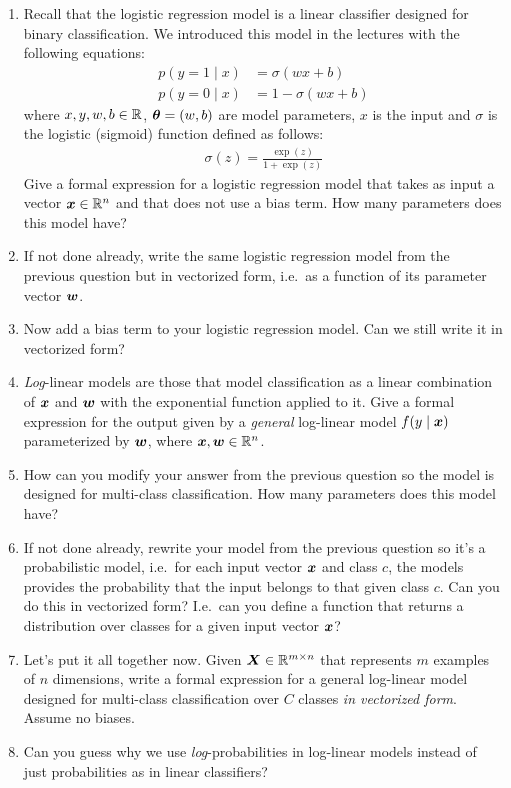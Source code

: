 \documentclass[11pt,a4paper]{article}
\begin{document}
\begin{enumerate}[label=(\alph*)]
    \item Recall that the logistic regression model is a linear classifier
          designed for binary classification. We introduced this model in the
          lectures with the following equations:
          \begin{align}
              p(y=1\mid x) & = \sigma(w x + b)     \\
              p(y=0\mid x) & = 1 - \sigma(w x + b)
          \end{align}
          where $x,y,w,b\in\mathbb{R}$, ${\boldsymbol{\theta}}=(w,b)$ are model parameters, $x$ is
          the input and $\sigma$ is the logistic (sigmoid) function defined
          as follows:
          \begin{align}\label{eq:sigmoid}
              \sigma(z) = \frac{\exp{(z)}}{1 + \exp{(z)}}
          \end{align}
          Give a formal expression for a logistic regression model that takes as
          input a vector ${\boldsymbol{x}}\in\mathbb{R}^n$ and that does not use a bias term.
          How many parameters does this model have?
    \item If not done already, write the same logistic regression model from the
          previous question but in vectorized form, i.e.\ as a function of its
          parameter vector ${\boldsymbol{w}}$.
    \item Now add a bias term to your logistic regression model. Can we still
          write it in vectorized form?
    \item \emph{Log}-linear models are those that model classification as a
          linear combination of ${\boldsymbol{x}}$ and ${\boldsymbol{w}}$ with the exponential function
          applied to it.
          Give a formal expression for the output given by a \emph{general}
          log-linear model $f(y\mid{\boldsymbol{x}})$ parameterized by ${\boldsymbol{w}}$, where
          ${\boldsymbol{x}},{\boldsymbol{w}}\in\mathbb{R}^n$.
    \item How can you modify your answer from the previous question so the model
          is designed for multi-class classification. How many parameters does 
          this model have?
    \item If not done already, rewrite your model from the previous question so
          it's a probabilistic model, i.e.\ for each input vector ${\boldsymbol{x}}$ and
          class $c$, the models provides the probability that the input belongs
          to that given class $c$. Can you do this in vectorized form? I.e.\ can
          you define a function that returns a distribution over classes for a
          given input vector ${\boldsymbol{x}}$?
    \item Let's put it all together now. Given ${\boldsymbol{X}}\in\mathbb{R}^{m\times n}$ that
          represents $m$ examples of $n$ dimensions, write a formal expression
          for a general log-linear model designed for multi-class classification
          over $C$ classes \emph{in vectorized form}. Assume no biases.
    \item Can you guess why we use \emph{log}-probabilities in log-linear models
          instead of just probabilities as in linear classifiers?
\end{enumerate}
\end{document}
